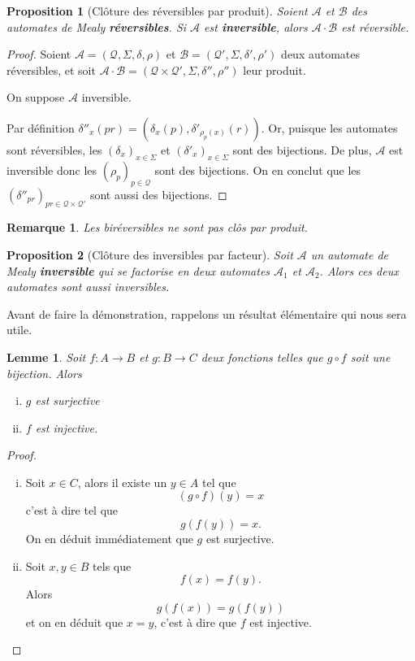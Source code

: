 \documentclass[11pt,a4paper]{article}
\newtheorem{prop}{Proposition}
\newtheorem{lemma}{Lemme}
\newtheorem*{rem*}{Remarque}
\begin{document}
\begin{prop}[Clôture des réversibles par produit]
  Soient $\mathcal{A}$ et $\mathcal{B}$ des automates de Mealy \textbf{réversibles}. Si $\mathcal{A}$ est \textbf{inversible}, alors $\mathcal{A}\cdot\mathcal{B}$ est réversible.
\end{prop}

\begin{proof}
  Soient $\mathcal{A}=\left(\mathcal{Q}, \Sigma, \delta, \rho\right)$ et $\mathcal{B}=\left(\mathcal{Q'}, \Sigma, \delta', \rho'\right)$ deux automates réversibles, et soit $\mathcal{A\cdot B}=\left(\mathcal{Q\times Q'}, \Sigma, \delta'', \rho''\right)$ leur produit.


  On suppose $\mathcal{A}$ inversible.


  Par définition $\delta''_x(pr)=(\delta_x(p), \delta'_{\rho_p(x)}(r))$. Or, puisque les automates sont réversibles, les $(\delta_x)_{x\in\Sigma}$ et ${(\delta'_x)}_{x\in\Sigma}$ sont des bijections. De plus, $\mathcal{A}$ est inversible donc les ${(\rho_p)}_{p\in \mathcal{Q}}$ sont des bijections. On en conclut que les ${(\delta''_{pr})}_{pr\in\mathcal{Q}\times\mathcal{Q'}}$ sont aussi des bijections.
\end{proof}

\begin{rem*}
	Les biréversibles ne sont pas clôs par produit.	
\end{rem*}

\begin{prop}[Clôture des inversibles par facteur]\label{prop_cloture_inv_facteurs}
  Soit $\mathcal{A}$ un automate de Mealy \textbf{inversible} qui se factorise en deux automates $\mathcal{A}_1$ et $\mathcal{A}_2$. Alors ces deux automates sont aussi inversibles.
\end{prop}

Avant de faire la démonstration, rappelons un résultat élémentaire qui nous sera utile.
\begin{lemma}\label{lem:bij}
  Soit $f:A\rightarrow B$ et $g:B\rightarrow C$ deux fonctions telles que $g\circ f$ soit une bijection.
  Alors
  \begin{enumerate}[(i)]
  \item $g$ est surjective
  \item $f$ est injective.
  \end{enumerate}
\end{lemma}

\begin{proof}
  \begin{enumerate}[(i)]
  \item Soit $x\in C$, alors il existe un $y\in A$ tel que
    \[ (g\circ f)(y) = x \]
    c'est à dire tel que
    \[ g(f(y)) = x. \]
    On en déduit immédiatement que $g$ est surjective.

  \item Soit $x,y \in B$ tels que \[ f(x) = f(y). \] Alors \[ g(f(x)) = g(f(y)) \] et on en déduit que $x = y$, c'est à dire que $f$ est injective.
  \end{enumerate}
\end{proof}
\end{document}

